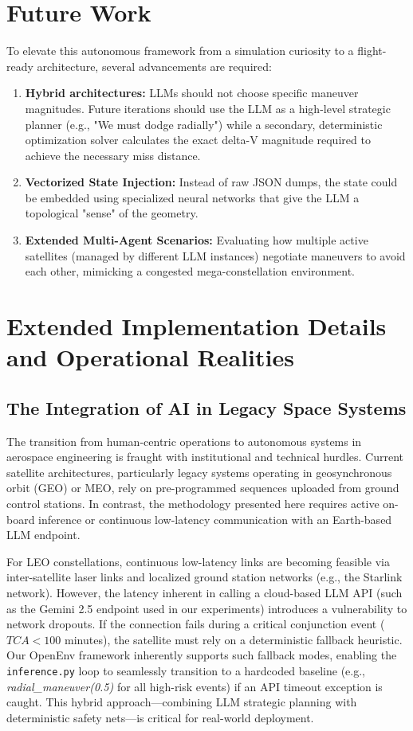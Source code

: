 \documentclass[10pt,journal,compsoc]{IEEEtran}
\begin{document}
\section{Future Work}
To elevate this autonomous framework from a simulation curiosity to a flight-ready architecture, several advancements are required:
\begin{enumerate}
    \item \textbf{Hybrid architectures:} LLMs should not choose specific maneuver magnitudes. Future iterations should use the LLM as a high-level strategic planner (e.g., "We must dodge radially") while a secondary, deterministic optimization solver calculates the exact delta-V magnitude required to achieve the necessary miss distance.
    \item \textbf{Vectorized State Injection:} Instead of raw JSON dumps, the state could be embedded using specialized neural networks that give the LLM a topological "sense" of the geometry.
    \item \textbf{Extended Multi-Agent Scenarios:} Evaluating how multiple active satellites (managed by different LLM instances) negotiate maneuvers to avoid each other, mimicking a congested mega-constellation environment.
\end{enumerate}

\section{Extended Implementation Details and Operational Realities}
\subsection{The Integration of AI in Legacy Space Systems}
The transition from human-centric operations to autonomous systems in aerospace engineering is fraught with institutional and technical hurdles. Current satellite architectures, particularly legacy systems operating in geosynchronous orbit (GEO) or MEO, rely on pre-programmed sequences uploaded from ground control stations. In contrast, the methodology presented here requires active on-board inference or continuous low-latency communication with an Earth-based LLM endpoint. 

For LEO constellations, continuous low-latency links are becoming feasible via inter-satellite laser links and localized ground station networks (e.g., the Starlink network). However, the latency inherent in calling a cloud-based LLM API (such as the Gemini 2.5 endpoint used in our experiments) introduces a vulnerability to network dropouts. If the connection fails during a critical conjunction event ($TCA < 100$ minutes), the satellite must rely on a deterministic fallback heuristic. Our OpenEnv framework inherently supports such fallback modes, enabling the \texttt{inference.py} loop to seamlessly transition to a hardcoded baseline (e.g., \textit{radial\_maneuver(0.5)} for all high-risk events) if an API timeout exception is caught. This hybrid approach—combining LLM strategic planning with deterministic safety nets—is critical for real-world deployment.
\end{document}
